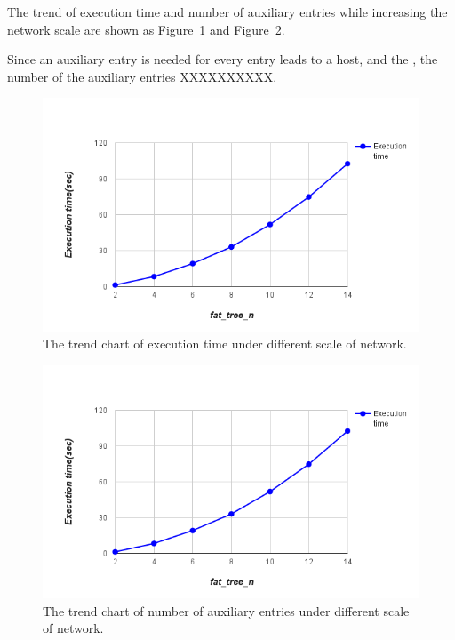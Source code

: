 The trend of execution time and number of auxiliary entries while increasing the network scale are shown as Figure~\ref{different_scale_time_trend} and Figure~\ref{different_scale_aux_trend}. 


Since an auxiliary entry is needed for every entry leads to a host, and the , the number of the auxiliary entries 
XXXXXXXXXX.


\begin{figure}[H]
\begin{center} 
\includegraphics[width=1\textwidth]{figures/exp_scale_time_trend.png}
\end{center}
\caption{The trend chart of execution time under different scale of network.}
\label{different_scale_time_trend}
\end{figure}



\begin{figure}[H]
\begin{center} 
\includegraphics[width=1\textwidth]{figures/exp_scale_time_trend.png}
\end{center}
\caption{The trend chart of number of auxiliary entries under different scale of network.}
\label{different_scale_aux_trend}
\end{figure}



